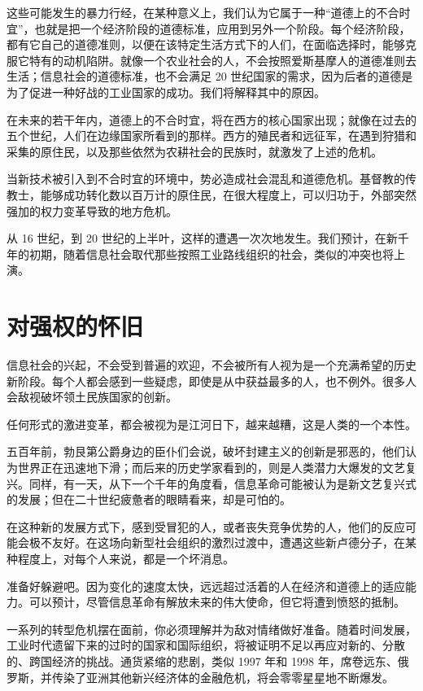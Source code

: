 这些可能发生的暴力行经，在某种意义上，我们认为它属于一种“道德上的不合时宜”，也就是把一个经济阶段的道德标准，应用到另外一个阶段。每个经济阶段，都有它自己的道德准则，以便在该特定生活方式下的人们，在面临选择时，能够克服它特有的动机陷阱。就像一个农业社会的人，不会按照爱斯基摩人的道德准则去生活；信息社会的道德标准，也不会满足 20 世纪国家的需求，因为后者的道德是为了促进一种好战的工业国家的成功。我们将解释其中的原因。


在未来的若干年内，道德上的不合时宜，将在西方的核心国家出现；就像在过去的五个世纪，人们在边缘国家所看到的那样。西方的殖民者和远征军，在遇到狩猎和采集的原住民，以及那些依然为农耕社会的民族时，就激发了上述的危机。


当新技术被引入到不合时宜的环境中，势必造成社会混乱和道德危机。基督教的传教士，能够成功转化数以百万计的原住民，在很大程度上，可以归功于，外部突然强加的权力变革导致的地方危机。


从 16 世纪，到 20 世纪的上半叶，这样的遭遇一次次地发生。我们预计，在新千年的初期，随着信息社会取代那些按照工业路线组织的社会，类似的冲突也将上演。


\section{对强权的怀旧}
信息社会的兴起，不会受到普遍的欢迎，不会被所有人视为是一个充满希望的历史新阶段。每个人都会感到一些疑虑，即使是从中获益最多的人，也不例外。很多人会敌视破坏领土民族国家的创新。


任何形式的激进变革，都会被视为是江河日下，越来越糟，这是人类的一个本性。


五百年前，勃艮第公爵身边的臣仆们会说，破坏封建主义的创新是邪恶的，他们认为世界正在迅速地下滑；而后来的历史学家看到的，则是人类潜力大爆发的文艺复兴。同样，有一天，从下一个千年的角度看，信息革命可能被认为是新文艺复兴式的发展；但在二十世纪疲惫者的眼睛看来，却是可怕的。


在这种新的发展方式下，感到受冒犯的人，或者丧失竞争优势的人，他们的反应可能会极不友好。在这场向新型社会组织的激烈过渡中，遭遇这些新卢德分子，在某种程度上，对每个人来说，都是一个坏消息。


准备好躲避吧。因为变化的速度太快，远远超过活着的人在经济和道德上的适应能力。可以预计，尽管信息革命有解放未来的伟大使命，但它将遭到愤怒的抵制。


一系列的转型危机摆在面前，你必须理解并为敌对情绪做好准备。随着时间发展，工业时代遗留下来的过时的国家和国际组织，将被证明不足以再应对新的、分散的、跨国经济的挑战。通货紧缩的悲剧，类似 1997 年和 1998 年，席卷远东、俄罗斯，并传染了亚洲其他新兴经济体的金融危机，将会零零星星地不断爆发。


